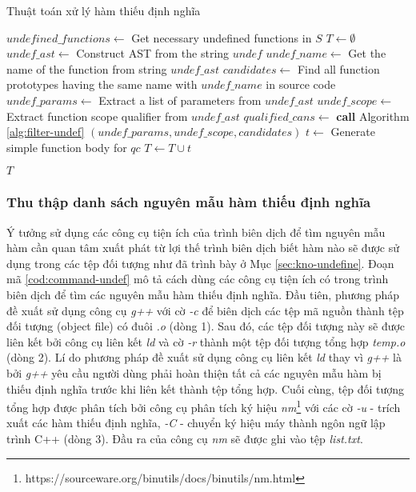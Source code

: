 \begin{algorithm}[ht]
    \small
    \caption{Thuật toán xử lý hàm thiếu định nghĩa}
    \label{alg:handle-ref}
					
    $undefined\_functions \leftarrow $ Get necessary undefined functions in $S$\;
    $T \leftarrow \emptyset$\;
     {
        $undef\_ast\leftarrow$ Construct AST from the string $undef$\;
        $undef\_name \leftarrow$ Get the name of the function from string $undef\_ast$\;
        $candidates \leftarrow$ Find all function prototypes having the same name with $undef\_name$ in source code\;
        $undef\_params \leftarrow$ Extract a list of parameters from $undef\_ast$\;
        $undef\_scope\leftarrow$ Extract function scope qualifier from $undef\_ast$\;
        $qualified\_cans\leftarrow$ \textbf{call} Algorithm \ref{alg:filter-undef} $(undef\_params, undef\_scope, candidates)$\;
         {
            $t \leftarrow $ Generate simple function body for $qc$\;
            $T \leftarrow T \cup {t}$
        }
    }

    \Return $T$
\end{algorithm}

\subsubsection*{Thu thập danh sách nguyên mẫu hàm thiếu định nghĩa}\label{sec:find-undef}
Ý tưởng sử dụng các công cụ tiện ích của trình biên dịch để tìm nguyên mẫu hàm cần quan tâm xuất phát từ lợi thế trình biên dịch biết hàm nào sẽ được sử dụng trong các tệp đối tượng như đã trình bày ở Mục \ref{sec:kno-undefine}. Đoạn mã \ref{cod:command-undef} mô tả cách dùng các công cụ tiện ích có trong trình biên dịch để tìm các nguyên mẫu hàm thiếu định nghĩa. Đầu tiên, phương pháp đề xuất sử dụng công cụ \textit{g++} với cờ \textit{-c} để biên dịch các tệp mã nguồn thành tệp đối tượng (object file) có đuôi \textit{.o} (dòng 1). Sau đó, các tệp đối tượng này sẽ được liên kết bởi công cụ liên kết \textit{ld} và cờ \textit{-r} thành một tệp đối tượng tổng hợp \textit{temp.o} (dòng 2). Lí do phương pháp đề xuất sử dụng công cụ liên kết \textit{ld} thay vì \textit{g++} là bởi \textit{g++} yêu cầu người dùng phải hoàn thiện tất cả các nguyên mẫu hàm bị thiếu định nghĩa trước khi liên kết thành tệp tổng hợp. Cuối cùng, tệp đối tượng tổng hợp được phân tích bởi công cụ phân tích ký hiệu \textit{nm}\footnote{https://sourceware.org/binutils/docs/binutils/nm.html} với các cờ \textit{-u} - trích xuất các hàm thiếu định nghĩa, \textit{-C} - chuyển ký hiệu máy thành ngôn ngữ lập trình C++ (dòng 3). Đầu ra của công cụ \textit{nm} sẽ được ghi vào tệp \textit{list.txt}.\\

